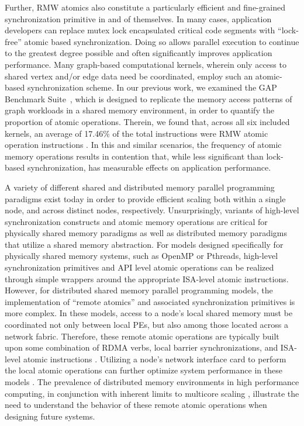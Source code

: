 Further, RMW atomics also constitute a particularly efficient and fine-grained synchronization primitive in and of themselves.
In many cases, application developers can replace mutex lock encapsulated critical code segments with ``lock-free'' atomic based synchronization.
Doing so allows parallel execution to continue to the greatest degree possible and often significantly improves application performance.
Many graph-based computational kernels, wherein only access to shared vertex and/or edge data need be coordinated, employ such an atomic-based synchronization scheme.
In our previous work, we examined the GAP Benchmark Suite~\cite{beamer2015gap}, which is designed to replicate the memory access patterns of graph workloads in a shared memory environment, in order to quantify the proportion of atomic operations.
Therein, we found that, across all six included kernels, an average of 17.46\% of the total instructions were RMW atomic operation instructions \cite{rae}.
In this and similar scenarios, the frequency of atomic memory operations results in contention that, while less significant than lock-based synchronization, has measurable effects on application performance.

A variety of different shared and distributed memory parallel programming paradigms exist today in order to provide efficient scaling both within a single node, and across distinct nodes, respectively.
Unsurprisingly, variants of high-level synchronization constructs and atomic memory operations are critical for physically shared memory paradigms as well as distributed memory paradigms that utilize a shared memory abstraction.
For models designed specifically for physically shared memory systems, such as OpenMP or Pthreads, high-level synchronization primitives and API level atomic operations can be realized through simple wrappers around the appropriate ISA-level atomic instructions.
However, for distributed shared memory parallel programming models, the implementation of ``remote atomics'' and associated synchronization primitives is more complex.
In these models, access to a node's local shared memory must be coordinated not only between local PEs, but also among those located across a network fabric.
Therefore, these remote atomic operations are typically built upon some combination of RDMA verbs, local barrier synchronizations, and ISA-level atomic instructions \cite{chen2017rdmahtm}\cite{kalia2016rdmadesign}.
Utilizing a node's network interface card to perform the local atomic operations can further optimize system performance in these models \cite{rae}.
The prevalence of distributed memory environments in high performance computing, in conjunction with inherent limits to multicore scaling \cite{esmaeilzadeh2011silicon}, illustrate the need to understand the behavior of these remote atomic operations when designing future systems.

